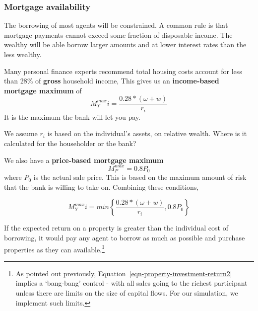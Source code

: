  
\subsubsection{Mortgage availability} \label{section-mortgage-availability}
The borrowing of most agents will be constrained. A common rule is that mortgage payments cannot exceed some fraction of disposable income. The wealthy will be able borrow larger amounts and at lower interest rates than the less wealthy.

Many personal finance experts recommend total housing costs account for less than 28\% of \textbf{gross} household income, This gives us an \textbf{income-based  mortgage maximum} of \[M^{max}_Yi = \frac{0.28*(\omega+w)}{r_i}\] It is the maximum the bank will let you pay.

We assume $r_i$ is based on the individual's assets, on relative wealth. Where is it calculated for the householder or the bank?

We also have  a \textbf{price-based mortgage maximum} \[M^{max}_P = 0.8P_0\] where $P_0$ is the actual sale price. This is based on the maximum amount of risk that the bank is willing to take on. Combining these conditions, %

\[M^{max}_Yi = min\left\{\frac{0.28*(\omega+w)}{r_i},  0.8P_0 \right\} \]



If the expected return on a property is greater than the individual cost of borrowing, it would pay any agent to borrow as much as possible and purchase properties as they can available.\footnote{As pointed out previously,  Equation~\ref{eqn-property-investment-return2} implies a `bang-bang' control - with all sales going to the richest participant unless there are limits on the size of capital flows. For our simulation, we implement such limits. } 
 




